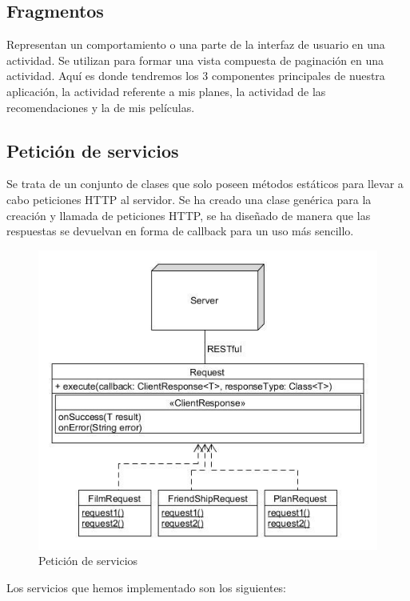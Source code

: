 \subsection{Fragmentos}
\label{makereference4.4.5}
Representan un comportamiento o una parte de la interfaz de usuario en una actividad.
Se utilizan para formar una vista compuesta de paginación en una actividad. 
Aquí es donde tendremos los 3 componentes principales de nuestra aplicación, la actividad referente a mis planes, la actividad de las recomendaciones y la de mis películas.

\subsection{Petición de servicios}
\label{makereference4.4.6}
Se trata de un conjunto de clases que solo poseen métodos estáticos para llevar a cabo peticiones HTTP al servidor. Se ha creado una clase genérica para la creación y llamada de peticiones HTTP, se ha diseñado de manera que las respuestas se devuelvan en forma de callback para un uso más sencillo.
\begin{figure}[H]
    \centering
    \includegraphics[width=6in]{figures/chapter-4/Request.jpeg}
    \caption{Petición de servicios}
    \label{fig:activity}
\end{figure}
Los servicios que hemos implementado son los siguientes:
